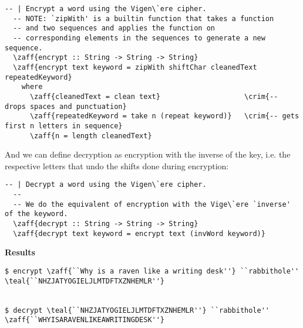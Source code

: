\begin{Answer}
\noindent
{}

\begin{Verbatim}[commandchars=\\\{\}]
  -- | Encrypt a word using the Vigen\`ere cipher.
  -- NOTE: `zipWith' is a builtin function that takes a function 
  -- and two sequences and applies the function on
  -- corresponding elements in the sequences to generate a new sequence.
  \zaff{encrypt :: String -> String -> String}
  \zaff{encrypt text keyword = zipWith shiftChar cleanedText repeatedKeyword}
    where
      \zaff{cleanedText = clean text}                    \crim{-- drops spaces and punctuation}
      \zaff{repeatedKeyword = take n (repeat keyword)}   \crim{-- gets first n letters in sequence}
      \zaff{n = length cleanedText}
\end{Verbatim}
\color{black}
\noindent
And we can define decryption as encryption with the inverse of the key, i.e.
the respective letters that undo the shifts done during encryption:

\color{crimson}
\begin{Verbatim}[commandchars=\\\{\}]
  -- | Decrypt a word using the Vigen\`ere cipher.
  --
  -- We do the equivalent of encryption with the Vige\`ere `inverse' of the keyword.
  \zaff{decrypt :: String -> String -> String}
  \zaff{decrypt text keyword = encrypt text (invWord keyword)}
\end{Verbatim}
\color{black}

\begin{center}\textbf{Results}\end{center}

\color{crimson}
\begin{Verbatim}[commandchars=\\\{\}]
$ encrypt \zaff{``Why is a raven like a writing desk''} ``rabbithole''
\teal{``NHZJATYOGIELJLMTDFTXZNHEMLR''}


$ decrypt \teal{``NHZJATYOGIELJLMTDFTXZNHEMLR''} ``rabbithole''
\zaff{``WHYISARAVENLIKEAWRITINGDESK''}
\end{Verbatim}
\color{black}
\end{Answer}

